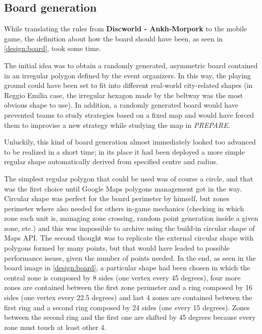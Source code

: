 		\subsection{Board generation}\label{focus:board}
		
			While translating the rules from \textbf{Discworld - Ankh-Morpork} to the mobile game, the definition about how the board should have been, as seen in \autoref{design:board}, took some time.
			
			The initial idea was to obtain a randomly generated, asymmetric board contained in an irregular polygon defined by the event organizers.
			In this way, the playing ground could have been set to fit into different real-world city-related shapes (in Reggio Emilia case, the irregular hexagon made by the beltway was the most obvious shape to use).
			In addition, a randomly generated board would have prevented teams to study strategies based on a fixed map and would have forced them to improvise a new strategy while studying the map in \emph{PREPARE}.
			
			Unluckily, this kind of board generation almost immediately looked too advanced to be realized in a short time; in its place it had been deployed a more simple regular shape automatically derived from specified centre and radius.
			
			The simplest regular polygon that could be used was of course a circle, and that was the first choice until Google Maps polygons management got in the way. Circular shape was perfect for the board perimeter by himself, but zones perimeter where also needed for others in-game mechanics (checking in which zone each unit is, managing zone crossing, random point generation inside a given zone, etc.) and this was impossible to archive using the build-in circular shape of Maps API.
			The second thought was to replicate the external circular shape with polygons formed by many points, but that would have leaded to possible performance issues, given the number of points needed.
			In the end, as seen in the board image in \autoref{design:board}, a particular shape had been chosen in which the central zone is composed by 8 sides (one vertex every 45 degrees), four more zones are contained between the first zone perimeter and a ring composed by 16 sides (one vertex every 22.5 degrees) and last 4 zones are contained between the first ring and a second ring composed by 24 sides (one every 15 degrees).
			Zones between the second ring and the first one are shifted by 45 degrees because every zone must touch at least other 4.
			
